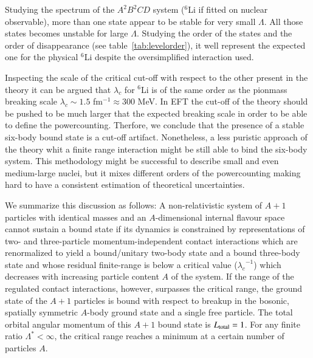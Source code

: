 \documentclass[preprint,12pt]{elsarticle}
\newcommand{\lc}{\ensuremath{\lambda_c}}
\newcommand{\tabref}[1]{table~\ref{#1}}
\begin{document}
Studying the spectrum of the $A^2B^2CD$ system ($^6$Li if fitted on nuclear observable), more than one state appear to be stable for very small $\Lambda$.
All those states becomes unstable for large $\Lambda$. 
Studying the order of the states and the order of disappearance (see \tabref{tab:levelorder}), it well represent the expected one for the physical $^6$Li despite the oversimplified interaction used.

Inspecting the scale of the critical cut-off with respect to the other present in the theory it can be argued that $\lc$ for $^6$Li is of the same order  as the pionmass breaking scale $\lc\sim1.5$ fm$^{-1} \approx300$ MeV.
In EFT the cut-off of the theory should be pushed to be much larger that the expected breaking scale in order to be able to define the powercounting.
Therfore, we conclude that the presence of a stable six-body bound state is a cut-off artifact.
Nonetheless, a less puristic approach of the theory whit a finite range interaction might be still able to bind the six-body system. 
This methodology might be successful to describe small and even medium-large nuclei, but it mixes different orders of the powercounting making hard to have a consistent estimation of theoretical uncertainties.


We summarize this discussion as follows:
A non-relativistic system of $A+1$ particles with identical masses and
an $A$-dimensional internal flavour space cannot sustain a bound state if
its dynamics is constrained by representations of two- and three-particle
momentum-independent contact interactions which are renormalized to yield
a bound/unitary two-body state and a bound three-body state and whose
residual finite-range is below a critical value ($\lc^{−1}$)
which decreases with increasing particle content $A$ of the system.
If the range of the regulated contact interactions, however, surpasses the
critical range, the ground state of the $A+1$ particles is bound with respect
to breakup in the bosonic, spatially symmetric $A$-body ground state and a
single free particle. The total orbital angular momentum of this $A+1$ bound
state is $L_{\text{\scriptsize total}}= 1$.
For any finite ratio $\Lambda^*<\infty$,
the critical range reaches a minimum at a certain number of particles $A$.
\end{document}
